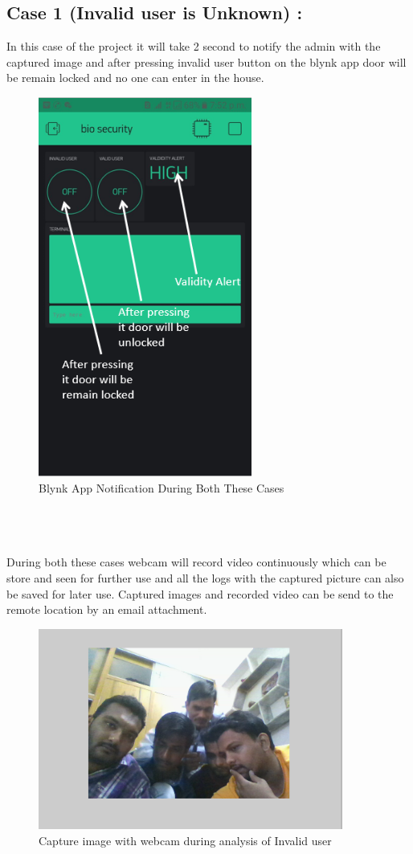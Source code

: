 \documentclass[twoside,a4paper,16pt]{book}
\begin{document}
{{			\subsection*{Case 1 (Invalid user is Unknown) :}
			In this case of the project it will take 2 second to notify the admin with the captured image and after pressing invalid user button on the blynk app door will be remain locked and no one can enter in the house.
			\begin{figure}[ht!]
				\begin{center}
					\includegraphics[width=7.0cm]{ff2.png}
					\caption{Blynk App Notification During Both These Cases}
				\end{center}
			\end{figure}
			\\
			\\
			\\
			During both these cases webcam will record video continuously which can be store and seen for further use and all the logs with the captured picture can also be saved for later use. Captured images and recorded video can be send to the remote location by an email attachment.
			\begin{figure}[ht!]
				\begin{center}
					\includegraphics[width=10.0cm]{ff1.png}
					\caption{Capture image with webcam during analysis of Invalid user}
				\end{center}
			\end{figure}
}}
\end{document}
